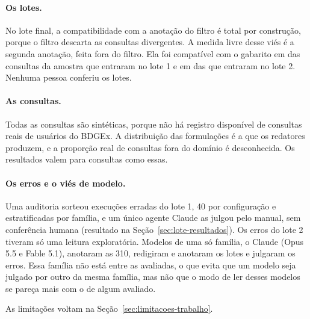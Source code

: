 \paragraph{Os lotes.} No lote final, a compatibilidade com a anotação do filtro é total por construção, porque o filtro descarta as consultas divergentes. A medida livre desse viés é a segunda anotação, feita fora do filtro. Ela foi compatível com o gabarito em  das  consultas da amostra que entraram no lote 1 e em  das  que entraram no lote 2. Nenhuma pessoa conferiu os lotes.

\paragraph{As consultas.} Todas as consultas são sintéticas, porque não há registro disponível de consultas reais de usuários do BDGEx. A distribuição das formulações é a que os redatores produzem, e a proporção real de consultas fora do domínio é desconhecida. Os resultados valem para consultas como essas.

\paragraph{Os erros e o viés de modelo.} Uma auditoria sorteou  execuções erradas do lote 1, 40 por configuração e estratificadas por família, e um único agente Claude as julgou pelo manual, sem conferência humana (resultado na Seção~\ref{sec:lote-resultados}). Os erros do lote 2 tiveram só uma leitura exploratória. Modelos de uma só família, o Claude (Opus 5.5 e Fable 5.1), anotaram as 310, redigiram e anotaram os lotes e julgaram os erros. Essa família não está entre as avaliadas, o que evita que um modelo seja julgado por outro da mesma família, mas não que o modo de ler desses modelos se pareça mais com o de algum avaliado.

As limitações voltam na Seção~\ref{sec:limitacoes-trabalho}.

